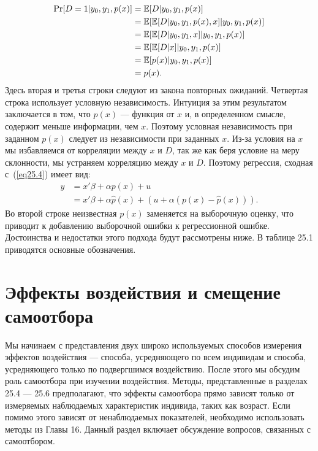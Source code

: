 \begin{align}
\mathrm{Pr}[D=1 | y_0, y_1, p(x)] & =  \mathbb{E}[D | y_0, y_1, p(x)] \nonumber \\
& =  \mathbb{E}[ \mathbb{E}[D | y_0, y_1, p(x), x] | y_0, y_1, p(x)] \nonumber \\
& =  \mathbb{E}[ \mathbb{E}[D | y_0, y_1, x] | y_0, y_1, p(x)] \nonumber \\
& =  \mathbb{E}[ \mathbb{E}[D | x] | y_0, y_1, p(x)] \nonumber \\
& =  \mathbb{E}[ p(x) | y_0, y_1, p(x)] \nonumber \\
& = p(x). \nonumber
\end{align}
Здесь вторая и третья строки следуют из закона повторных ожиданий. Четвертая строка использует условную независимость. Интуиция за этим результатом заключается в том, что $p(x)$ --- функция от $x$ и, в определенном смысле, содержит меньше информации, чем $x$. Поэтому условная независимость при заданном $p(x)$ следует из независимости при заданных $x$. Из-за условия на $x$ мы избавляемся от корреляции между $x$ и $D$, так же как беря условие на меру склонности, мы устраняем корреляцию между $x$ и $D$. Поэтому регрессия, сходная с~(\ref{eq25.4}) имеет вид:
\begin{align}
\label{eq25.12}
y & = x' \beta + \alpha p(x) + u \\
& = x' \beta + \alpha \hat p(x) + ( u + \alpha (p(x) - \hat p(x))).
\end{align}
Во второй строке неизвестная $p(x)$ заменяется на выборочную оценку, что приводит к добавлению выборочной ошибки к регрессионной ошибке. Достоинства и недостатки этого подхода будут рассмотрены ниже. В таблице 25.1 приводятся основные обозначения. 

\section{Эффекты воздействия и смещение самоотбора}

Мы начинаем с представления двух широко используемых способов измерения эффектов воздействия --- способа, усредняющего по всем индивидам и способа, усредняющего только по подвергшимся воздействию. После этого мы обсудим роль самоотбора при изучении воздействия. Методы, представленные в разделах 25.4 --- 25.6 предполагают, что эффекты самоотбора прямо зависят только от измеряемых наблюдаемых характеристик индивида, таких как возраст. Если помимо этого зависят от ненаблюдаемых показателей, необходимо использовать методы из Главы 16. Данный раздел включает обсуждение вопросов, связанных с самоотбором. 


